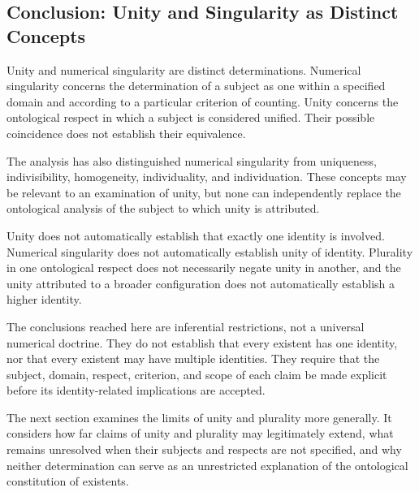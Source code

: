 \subsection{Conclusion: Unity and Singularity as Distinct Concepts}

Unity and numerical singularity are
distinct determinations. Numerical
singularity concerns the determination
of a subject as one within a specified
domain and according to a particular
criterion of counting. Unity concerns
the ontological respect in which a
subject is considered unified. Their
possible coincidence does not establish
their equivalence.

The analysis has also distinguished
numerical singularity from uniqueness,
indivisibility, homogeneity, individuality,
and individuation. These concepts may
be relevant to an examination of unity,
but none can independently replace
the ontological analysis of the subject
to which unity is attributed.

Unity does not automatically establish
that exactly one identity is involved.
Numerical singularity does not
automatically establish unity of identity.
Plurality in one ontological respect
does not necessarily negate unity in
another, and the unity attributed to
a broader configuration does not
automatically establish a higher identity.

The conclusions reached here are
inferential restrictions, not a
universal numerical doctrine. They
do not establish that every existent
has one identity, nor that every
existent may have multiple identities.
They require that the subject, domain,
respect, criterion, and scope of each
claim be made explicit before its
identity-related implications are
accepted.

The next section examines the limits
of unity and plurality more generally.
It considers how far claims of unity
and plurality may legitimately extend,
what remains unresolved when their
subjects and respects are not specified,
and why neither determination can
serve as an unrestricted explanation
of the ontological constitution of
existents.

